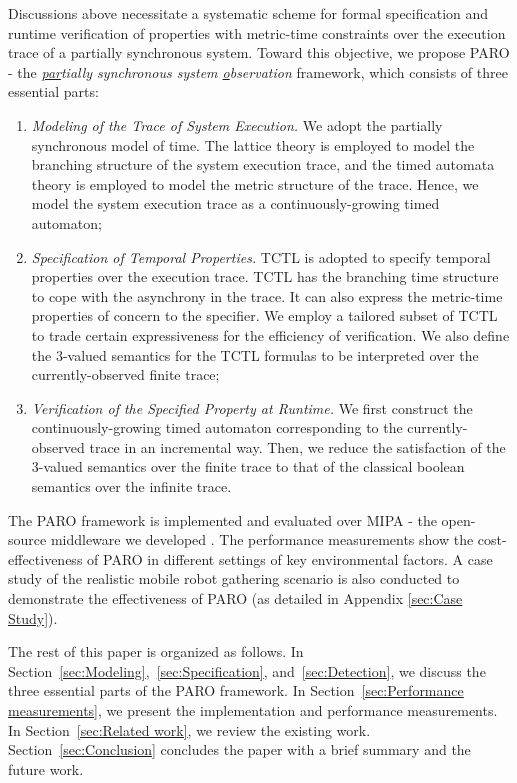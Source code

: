 \documentclass[10pt,conference,compsocconf,letterpaper]{IEEEtran}
\begin{document}
Discussions above necessitate a systematic scheme for formal specification and runtime verification of properties with metric-time constraints over the execution trace of a partially synchronous system. Toward this objective, we propose \textsf{PARO} - the \textit{\underline{par}tially synchronous system \underline{o}bservation} framework, which consists of three essential parts:
\begin{enumerate}\setlength{\itemsep}{0pt}
  \item {\it Modeling of the Trace of System Execution.} We adopt the partially synchronous model of time. The lattice theory is employed to model the branching structure of the system execution trace, and the timed automata theory is employed to model the metric structure of the trace. Hence, we model the system execution trace as a continuously-growing timed automaton;
  \item {\it Specification of Temporal Properties.} TCTL is adopted to specify temporal properties over the execution trace. TCTL has the branching time structure to cope with the asynchrony in the trace. It can also express the metric-time properties of concern to the specifier. We employ a tailored subset of TCTL to trade certain expressiveness for the efficiency of verification. We also define the 3-valued semantics for the TCTL formulas to be interpreted over the currently-observed finite trace;
  \item {\it Verification of the Specified Property at Runtime.} We first construct the continuously-growing timed automaton corresponding to the currently-observed trace in an incremental way. Then, we reduce the satisfaction of the 3-valued semantics over the finite trace to that of the classical boolean semantics over the infinite trace.
\end{enumerate}
The \textsf{PARO} framework is implemented and evaluated over MIPA - the open-source middleware we developed \cite{MIPA, Yang15}. The performance measurements show the cost-effectiveness of \textsf{PARO} in different settings of key environmental factors. A case study of the realistic mobile robot gathering scenario is also conducted to demonstrate the effectiveness of \textsf{PARO} (as detailed in Appendix \ref{sec:Case Study}). 

The rest of this paper is organized as follows. In Section~\ref{sec:Modeling},~\ref{sec:Specification}, and~\ref{sec:Detection}, we discuss the three essential parts of the \textsf{PARO} framework. In Section~\ref{sec:Performance measurements}, we present the implementation and performance measurements. In Section~\ref{sec:Related work}, we review the existing work. Section~\ref{sec:Conclusion} concludes the paper with a brief summary and the future work.
\end{document}

